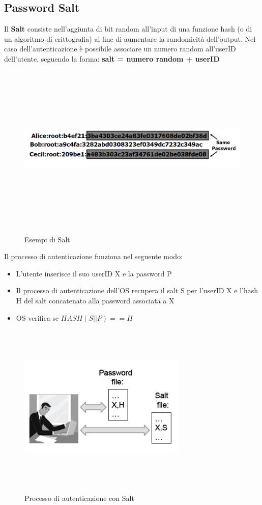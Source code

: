 \subsection{Password Salt}
Il \textbf{Salt} consiste nell'aggiunta di bit random all'input di una funzione hash (o di un algoritmo di crittografia) al fine di aumentare la randomicità dell'output. Nel caso dell’autenticazione è possibile associare un numero random all'userID dell’utente, seguendo la forma: \newline \newline
\textbf{salt = numero random + userID} \newline \newline
\begin{figure}[htbp]
	\centering%
	\subfigure%
	{\includegraphics[height=8cm, width=13cm, keepaspectratio]{Immagini/sistemi_operativi/password.png}}
	\caption{Esempi di Salt \label{fig:salt}} 	
\end{figure}
\newpage
Il processo di autenticazione funziona nel seguente modo:
\begin{itemize}
  \item L’utente inserisce il suo userID X e la password P
  \item Il processo di autenticazione dell’OS recupera il salt S per l’userID X e l’hash H del salt concatenato alla password associata a X
  \item OS verifica se $HASH(S \vert \vert P) == H$
\end{itemize}
\begin{figure}[htbp]
	\centering%
	\subfigure%
	{\includegraphics[height=8cm, width=8cm, keepaspectratio]{Immagini/sistemi_operativi/password2.png}}
	\caption{Processo di autenticazione con Salt \label{fig:salt}} 	
\end{figure}
